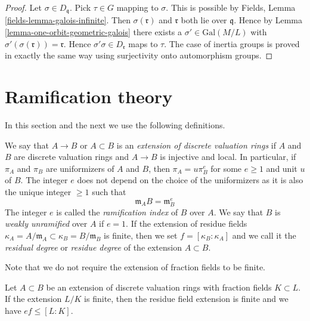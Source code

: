 \begin{proof}
Let $\sigma \in D_\mathfrak q$. Pick $\tau \in G$ mapping to $\sigma$.
This is possible by Fields, Lemma \ref{fields-lemma-galois-infinite}.
Then $\sigma(\mathfrak r)$ and $\mathfrak r$ both lie over $\mathfrak q$.
Hence by Lemma \ref{lemma-one-orbit-geometric-galois}
there exists a $\sigma' \in \text{Gal}(M/L)$ with
$\sigma'(\sigma(\mathfrak r)) = \mathfrak r$. Hence
$\sigma'\sigma \in D_\mathfrak r$ maps to $\tau$.
The case of inertia groups is proved in exactly the same
way using surjectivity onto automorphism groups.
\end{proof}








\section{Ramification theory}
\label{section-ramification}


\noindent
In this section and the next we use the following definitions.

\begin{definition}
\label{definition-extension-discrete-valuation-rings}
We say that $A \to B$ or $A \subset B$ is an
{\it extension of discrete valuation rings} if $A$ and $B$ are
discrete valuation rings and $A \to B$ is injective and local.
In particular, if $\pi_A$ and $\pi_B$ are uniformizers of
$A$ and $B$, then $\pi_A = u \pi_B^e$ for some $e \geq 1$ and unit
$u$ of $B$. The integer $e$ does not depend on the choice of
the uniformizers as it is also the unique integer $\geq 1$ such that
$$
\mathfrak m_A B = \mathfrak m_B^e
$$
The integer $e$ is called the {\it ramification index} of $B$ over $A$.
We say that $B$ is {\it weakly unramified} over $A$ if $e = 1$.
If the extension of residue fields
$\kappa_A = A/\mathfrak m_A \subset \kappa_B = B/\mathfrak m_B$
is finite, then we set $f = [\kappa_B : \kappa_A]$ and we
call it the {\it residual degree} or {\it residue degree}
of the extension $A \subset B$.
\end{definition}

\noindent
Note that we do not require the extension of fraction fields to be finite.

\begin{lemma}
\label{lemma-inequality}
Let $A \subset B$ be an extension of discrete valuation rings with
fraction fields $K \subset L$. If the extension $L/K$
is finite, then the residue field extension is finite and we have
$ef \leq [L : K]$.
\end{lemma}

